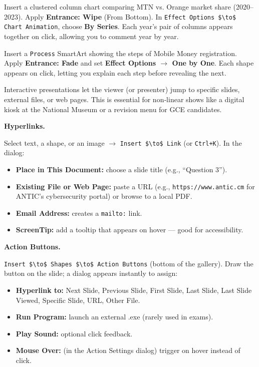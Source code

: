 \documentclass[11pt]{article}
\newcounter{popsec}
\newcounter{popsub}
\newcommand{\courssub}[1]{%
  \stepcounter{popsub}%
  \par\vspace{9pt}\noindent{\popxbold\fontsize{11.5}{13}\selectfont\color{popink}{\color{poporange}\thepopsec.\thepopsub}\hspace{6pt}#1}\par\nopagebreak\vspace{4pt}
}
\begin{document}
\begin{exemplebox}
Insert a clustered column chart comparing MTN vs. Orange market share (2020–2023). Apply \textbf{Entrance: Wipe} (From Bottom). In \texttt{Effect Options \$\textbackslash{}to\$ Chart Animation}, choose \textbf{By Series}. Each year’s pair of columns appears together on click, allowing you to comment year by year.
\end{exemplebox}

\begin{exemplebox}
Insert a \texttt{Process} SmartArt showing the steps of Mobile Money registration. Apply \textbf{Entrance: Fade} and set \textbf{Effect Options $\to$ One by One}. Each shape appears on click, letting you explain each step before revealing the next.
\end{exemplebox}

\courssub{Hyperlinks and Action Buttons}

Interactive presentations let the viewer (or presenter) jump to specific slides, external files, or web pages. This is essential for non‑linear shows like a digital kiosk at the National Museum or a revision menu for GCE candidates.

\textbf{Hyperlinks.}\par
Select text, a shape, or an image $\to$ \texttt{Insert \$\textbackslash{}to\$ Link} (or \texttt{Ctrl+K}). In the dialog:
\begin{itemize}
\item \textbf{Place in This Document:} choose a slide title (e.g., “Question 3”).
\item \textbf{Existing File or Web Page:} paste a URL (e.g., \texttt{https://www.antic.cm} for ANTIC’s cybersecurity portal) or browse to a local PDF.
\item \textbf{Email Address:} creates a \texttt{mailto:} link.
\item \textbf{ScreenTip:} add a tooltip that appears on hover — good for accessibility.
\end{itemize}

\textbf{Action Buttons.}\par
\texttt{Insert \$\textbackslash{}to\$ Shapes \$\textbackslash{}to\$ Action Buttons} (bottom of the gallery). Draw the button on the slide; a dialog appears instantly to assign:
\begin{itemize}
\item \textbf{Hyperlink to:} Next Slide, Previous Slide, First Slide, Last Slide, Last Slide Viewed, Specific Slide, URL, Other File.
\item \textbf{Run Program:} launch an external .exe (rarely used in exams).
\item \textbf{Play Sound:} optional click feedback.
\item \textbf{Mouse Over:} (in the Action Settings dialog) trigger on hover instead of click.
\end{itemize}
\end{document}
